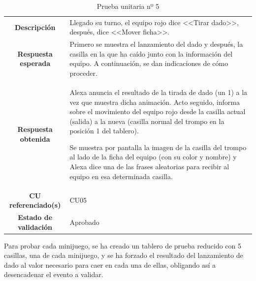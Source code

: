 \begin{table}[H]
	\centering
	\begin{tabular}{|c|p{8.5cm}|}
		\hline
		\rowcolor{lightgray}
		\multicolumn{2}{|c|}{\textbf{PU05}: Jugar un turno} \\
		\hline
		\textbf{Descripción} & Llegado su turno, el equipo rojo dice <<Tirar dado>>, después, dice <<Mover ficha>>. \vspace{0.2cm} \\
		\hline
		\textbf{Respuesta esperada} & Primero se muestra el lanzamiento del dado y después, la casilla en la que ha caído junto con la información del equipo. A continuación, se dan indicaciones de cómo proceder. \vspace{0.2cm} \\
		\hline
		\textbf{Respuesta obtenida} & Alexa anuncia el resultado de la tirada de dado (un 1) a la vez que muestra dicha animación. Acto seguido, informa sobre el movimiento del equipo rojo desde la casilla actual (salida) a la nueva (casilla normal del trompo en la posición 1 del tablero). 
		
		Se muestra por pantalla la imagen de la casilla del trompo al lado de la ficha del equipo (con su color y nombre) y Alexa dice una de las frases aleatorias para recibir al equipo en esa determinada casilla. \\
		\hline
		\textbf{CU referenciado(s)} & CU05 \vspace{0.2cm} \\
		\hline
		\textbf{Estado de validación} & Aprobado \vspace{0.2cm} \\
		\hline
	\end{tabular}
	\caption{Prueba unitaria nº 5}
	\label{tab:PU05}
\end{table}

Para probar cada minijuego, se ha creado un tablero de prueba reducido con 5 casillas, una de cada minijuego, y se ha forzado el resultado del lanzamiento de dado al valor necesario para caer en cada una de ellas, obligando así a desencadenar el evento a validar.

